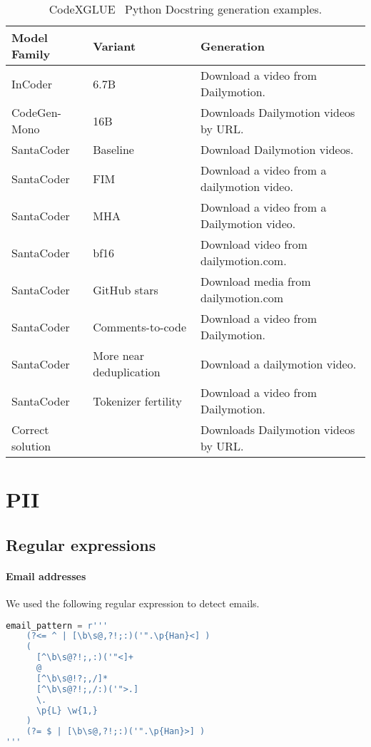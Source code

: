 \documentclass[10pt]{article} \usepackage{iclr2023_conference,times}
\begin{document}
\begin{table}[t]
\centering
\begin{tabular}{lll}
\toprule
Model Family & Variant & Generation\\
\midrule
InCoder & 6.7B & Download a video from Dailymotion.\\
CodeGen-Mono & 16B & Downloads Dailymotion videos by URL.\\
\midrule
SantaCoder & Baseline & Download Dailymotion videos.\\
SantaCoder & FIM & Download a video from a dailymotion video.\\
SantaCoder & MHA & Download a video from a Dailymotion video.\\
SantaCoder & bf16 & Download video from dailymotion.com.\\
\midrule
SantaCoder & GitHub stars & Download media from dailymotion.com\\
SantaCoder & Comments-to-code & Download a video from Dailymotion.\\
SantaCoder & More near deduplication & Download a dailymotion video.\\
SantaCoder & Tokenizer fertility & Download a video from Dailymotion.\\
\midrule
Correct solution & & Downloads Dailymotion videos by URL.\\
\bottomrule
\end{tabular}
\caption{CodeXGLUE~\citep{lu2021codexglue} Python Docstring generation examples.}
\label{tab:codexgluegen}
\end{table}




\newpage
\section{PII}\label{sec:pii}
\subsection{Regular expressions}
\label{sec:pii_regex}
\paragraph{Email addresses} We used the following regular expression to detect emails. 
\begin{lstlisting}[language=python] 
email_pattern = r'''
    (?<= ^ | [\b\s@,?!;:)('".\p{Han}<] )
    (
      [^\b\s@?!;,:)('"<]+
      @
      [^\b\s@!?;,/]*
      [^\b\s@?!;,/:)('">.]
      \.
      \p{L} \w{1,}
    )
    (?= $ | [\b\s@,?!;:)('".\p{Han}>] )
'''
\end{lstlisting}
\end{document}
